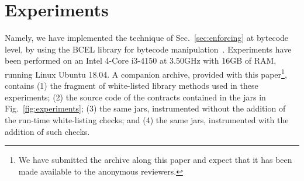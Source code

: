 \section{Experiments}\label{sec:experiments}

Namely, we have implemented the technique of Sec.~\ref{sec:enforcing}
at bytecode level, by using the BCEL
library for bytecode manipulation~\cite{bcel}.
Experiments have been performed on
an Intel 4-Core i3-4150 at $3.50$GHz with 16GB of RAM, running Linux Ubuntu 18.04.
A companion archive, provided with this paper\footnote{We have submitted the archive
along this paper and expect that it has been made available to the anonymous reviewers.},
contains (1) the fragment of white-listed library methods
used in these experiments; (2) the source code of the contracts
contained in the jars in Fig.~\ref{fig:experiments};
(3) the same jars, instrumented without the addition of the run-time white-listing
checks; and (4) the same jars, instrumented with the addition of such checks.

